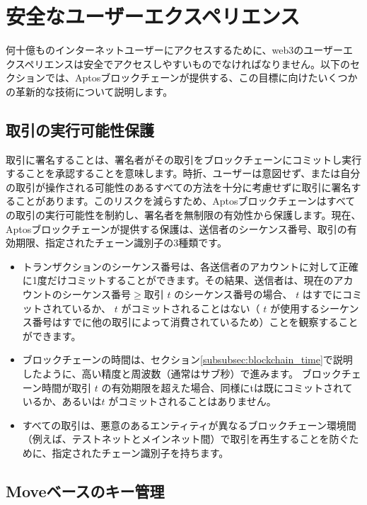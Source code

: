 \documentclass{article}
\begin{document}
\section{安全なユーザーエクスペリエンス}
\label{sec:user}

何十億ものインターネットユーザーにアクセスするために、web3のユーザーエクスペリエンスは安全でアクセスしやすいものでなければなりません。以下のセクションでは、Aptosブロックチェーンが提供する、この目標に向けたいくつかの革新的な技術について説明します。

\subsection{取引の実行可能性保護}
\label{subsec:transaction_replay_protection}

取引に署名することは、署名者がその取引をブロックチェーンにコミットし実行することを承認することを意味します。時折、ユーザーは意図せず、または自分の取引が操作される可能性のあるすべての方法を十分に考慮せずに取引に署名することがあります。このリスクを減らすため、Aptosブロックチェーンはすべての取引の実行可能性を制約し、署名者を無制限の有効性から保護します。現在、Aptosブロックチェーンが提供する保護は、送信者のシーケンス番号、取引の有効期限、指定されたチェーン識別子の3種類です。
\begin{itemize}
 \item トランザクションのシーケンス番号は、各送信者のアカウントに対して正確に1度だけコミットすることができます。その結果、送信者は、現在のアカウントのシーケンス番号$\geq$取引 $t$ のシーケンス番号の場合、 $t$ はすでにコミットされているか、 $t$ がコミットされることはない（  $t$ が使用するシーケンス番号はすでに他の取引によって消費されているため）ことを観察することができます。

 \item ブロックチェーンの時間は、セクション\ref{subsubsec:blockchain_time}で説明したように、高い精度と周波数（通常はサブ秒）で進みます。 ブロックチェーン時間が取引 $t$ の有効期限を超えた場合、同様にtは既にコミットされているか、あるいは$t$ がコミットされることはありません。

 \item すべての取引は、悪意のあるエンティティが異なるブロックチェーン環境間（例えば、テストネットとメインネット間）で取引を再生することを防ぐために、指定されたチェーン識別子を持ちます。

\end{itemize}

\subsection{Moveベースのキー管理}
\label{sub:move_based_key_management}
\end{document}
